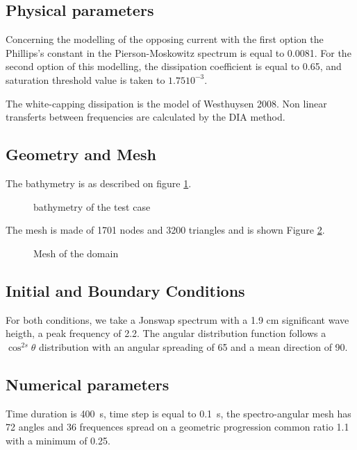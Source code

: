 \subsection{Physical parameters}
 Concerning the modelling of the opposing current with the first option the Phillips’s constant in the Pierson-Moskowitz spectrum is equal to 0.0081.
For the second option of this modelling, the dissipation coefficient is equal to 0.65, and saturation threshold value is taken to $1.75 10^{-3}$.

The white-capping dissipation is the model of Westhuysen 2008. Non linear transferts between frequencies are calculated by the DIA method.

%
%
%
\subsection{Geometry and Mesh}
%
The bathymetry is as described on figure \ref{bathyop}.
\begin{figure} [!h]
\centering
{}
 \caption{bathymetry of the test case }
\label{bathyop}
\end{figure}

The mesh is made of 1701 nodes and 3200 triangles  and is shown Figure \ref{mailop}.
\begin{figure} [!h]
\centering
{}
 \caption{Mesh of the domain}
\label{mailop}
\end{figure}



%
%
\subsection{Initial and Boundary Conditions}
%
For both conditions, we take a Jonswap spectrum with a 1.9 cm significant wave heigth, a peak frequency of 2.2. The angular distribution function follows a $\cos^{2s} \theta$ distribution with an angular spreading of 65 and a mean direction of 90.
%
%
\subsection{Numerical parameters}
%
Time duration is 400~s, time step is equal to 0.1~s, the spectro-angular mesh has 72 angles and 36 frequences spread on a geometric progression common ratio 1.1 with a minimum of 0.25.

